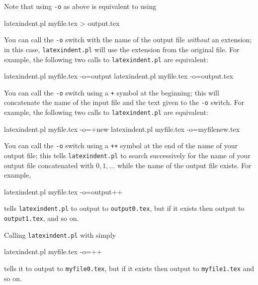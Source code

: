  Note that using \texttt{-o} as above is equivalent to using

 \begin{commandshell}
latexindent.pl myfile.tex > output.tex
\end{commandshell}

 You can call the \texttt{-o} switch with the name of the output file \emph{without} an
 extension; in  this case,
 \texttt{latexindent.pl} will use the extension from the original file. For example, the
 following two calls to \texttt{latexindent.pl} are equivalent:%

 \begin{commandshell}
latexindent.pl myfile.tex -o=output
latexindent.pl myfile.tex -o=output.tex
\end{commandshell}

 You can call the \texttt{-o} switch using a \texttt{+} symbol at the beginning; this
 will  concatenate the name of the input file
 and the text given to the \texttt{-o} switch. For example, the following two calls to
 \texttt{latexindent.pl} are equivalent:%

 \begin{commandshell}
latexindent.pl myfile.tex -o=+new
latexindent.pl myfile.tex -o=myfilenew.tex
\end{commandshell}

 You can call the \texttt{-o} switch using a \texttt{++} symbol at the end of the name
  of your output file; this tells
 \texttt{latexindent.pl} to search successively for the name of your output file
 concatenated with $0, 1, \ldots$ while the name of the output file exists. For example,%

 \begin{commandshell}
latexindent.pl myfile.tex -o=output++
\end{commandshell}

 tells \texttt{latexindent.pl} to output to \texttt{output0.tex}, but if it exists then
 output to \texttt{output1.tex}, and so on.

 Calling \texttt{latexindent.pl} with simply

 \begin{commandshell}
latexindent.pl myfile.tex -o=++
\end{commandshell}

 tells it to output to \texttt{myfile0.tex}, but if it exists then output to
 \texttt{myfile1.tex} and so on.

